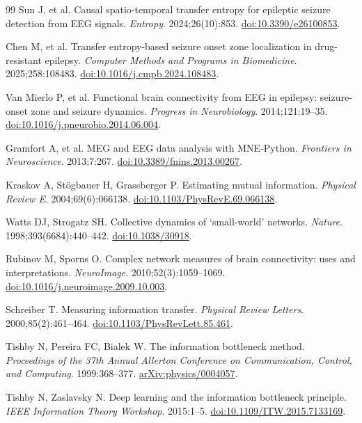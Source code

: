 \documentclass[a4paper,fleqn]{cas-dc}
\begin{document}
\begin{thebibliography}{99}
  Sun J, et al.
  Causal spatio-temporal transfer entropy for epileptic seizure
  detection from EEG signals.
  \textit{Entropy}. 2024;26(10):853.
  \href{https://doi.org/10.3390/e26100853}{doi:10.3390/e26100853}.

  Chen M, et al.
  Transfer entropy-based seizure onset zone localization in
  drug-resistant epilepsy.
  \textit{Computer Methods and Programs in Biomedicine}.
  2025;258:108483.
  \href{https://doi.org/10.1016/j.cmpb.2024.108483}{doi:10.1016/j.cmpb.2024.108483}.

  Van Mierlo P, et al.
  Functional brain connectivity from EEG in epilepsy: seizure-onset
  zone and seizure dynamics.
  \textit{Progress in Neurobiology}. 2014;121:19--35.
  \href{https://doi.org/10.1016/j.pneurobio.2014.06.004}{doi:10.1016/j.pneurobio.2014.06.004}.

  Gramfort A, et al.
  MEG and EEG data analysis with MNE-Python.
  \textit{Frontiers in Neuroscience}. 2013;7:267.
  \href{https://doi.org/10.3389/fnins.2013.00267}{doi:10.3389/fnins.2013.00267}.

  Kraskov A, St\"{o}gbauer H, Grassberger P.
  Estimating mutual information.
  \textit{Physical Review E}. 2004;69(6):066138.
  \href{https://doi.org/10.1103/PhysRevE.69.066138}{doi:10.1103/PhysRevE.69.066138}.

  Watts DJ, Strogatz SH.
  Collective dynamics of `small-world' networks.
  \textit{Nature}. 1998;393(6684):440--442.
  \href{https://doi.org/10.1038/30918}{doi:10.1038/30918}.

  Rubinov M, Sporns O.
  Complex network measures of brain connectivity: uses and
  interpretations.
  \textit{NeuroImage}. 2010;52(3):1059--1069.
  \href{https://doi.org/10.1016/j.neuroimage.2009.10.003}{doi:10.1016/j.neuroimage.2009.10.003}.

  Schreiber T.
  Measuring information transfer.
  \textit{Physical Review Letters}. 2000;85(2):461--464.
  \href{https://doi.org/10.1103/PhysRevLett.85.461}{doi:10.1103/PhysRevLett.85.461}.

  Tishby N, Pereira FC, Bialek W.
  The information bottleneck method.
  \textit{Proceedings of the 37th Annual Allerton Conference on
  Communication, Control, and Computing}. 1999:368--377.
  \href{https://arxiv.org/abs/physics/0004057}{arXiv:physics/0004057}.

  Tishby N, Zaslavsky N.
  Deep learning and the information bottleneck principle.
  \textit{IEEE Information Theory Workshop}. 2015:1--5.
  \href{https://doi.org/10.1109/ITW.2015.7133169}{doi:10.1109/ITW.2015.7133169}.


\end{thebibliography}
\end{document}
